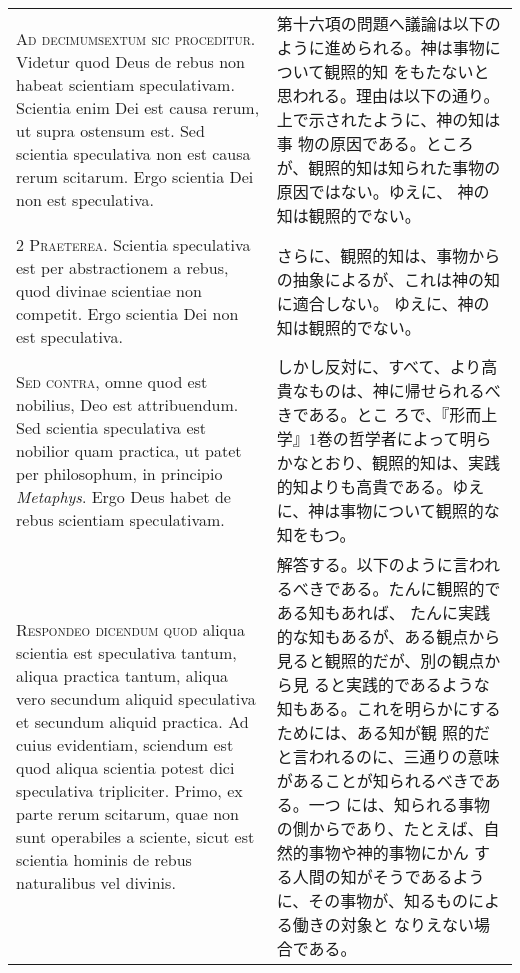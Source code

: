 \documentclass[10pt]{jsarticle} %
\begin{document}
\begin{longtable}{p{21em}p{21em}}


{\huge A}{\scshape d decimumsextum sic proceditur}. Videtur quod Deus
de rebus non habeat scientiam speculativam. Scientia enim Dei est
causa rerum, ut supra ostensum est. Sed scientia speculativa non est
causa rerum scitarum. Ergo scientia Dei non est speculativa.

&

第十六項の問題へ議論は以下のように進められる。神は事物について観照的知
をもたないと思われる。理由は以下の通り。上で示されたように、神の知は事
物の原因である。ところが、観照的知は知られた事物の原因ではない。ゆえに、
神の知は観照的でない。


\\


{\scshape 2 Praeterea}. Scientia speculativa est per abstractionem a
rebus, quod divinae scientiae non competit. Ergo scientia Dei non est
speculativa.

&

さらに、観照的知は、事物からの抽象によるが、これは神の知に適合しない。
ゆえに、神の知は観照的でない。

\\


{\scshape Sed contra}, omne quod est nobilius, Deo est
attribuendum. Sed scientia speculativa est nobilior quam practica, ut
patet per philosophum, in principio {\itshape Metaphys}. Ergo Deus
habet de rebus scientiam speculativam.

&

しかし反対に、すべて、より高貴なものは、神に帰せられるべきである。とこ
ろで、『形而上学』1巻の哲学者によって明らかなとおり、観照的知は、実践
的知よりも高貴である。ゆえに、神は事物について観照的な知をもつ。


\\


{\scshape Respondeo dicendum quod} aliqua scientia est speculativa
tantum, aliqua practica tantum, aliqua vero secundum aliquid
speculativa et secundum aliquid practica. Ad cuius evidentiam,
sciendum est quod aliqua scientia potest dici speculativa
tripliciter. Primo, ex parte rerum scitarum, quae non sunt operabiles
a sciente, sicut est scientia hominis de rebus naturalibus vel
divinis.


&

解答する。以下のように言われるべきである。たんに観照的である知もあれば、
たんに実践的な知もあるが、ある観点から見ると観照的だが、別の観点から見
ると実践的であるような知もある。これを明らかにするためには、ある知が観
照的だと言われるのに、三通りの意味があることが知られるべきである。一つ
には、知られる事物の側からであり、たとえば、自然的事物や神的事物にかん
する人間の知がそうであるように、その事物が、知るものによる働きの対象と
なりえない場合である。


\end{longtable}
\end{document}
